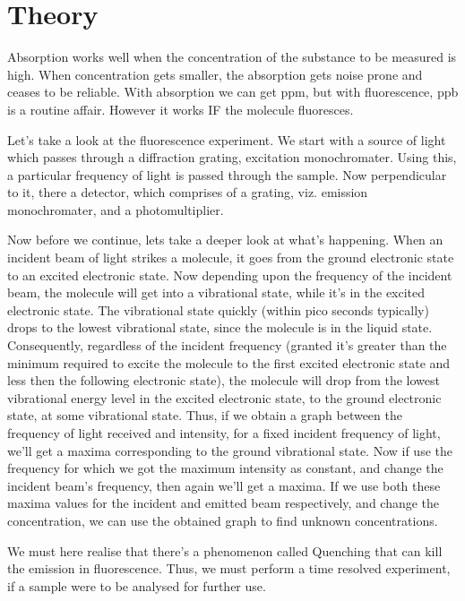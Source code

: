 \section{Theory}
	Absorption works well when the concentration of the substance to be measured is high. When concentration gets smaller, the absorption gets noise prone and ceases to be reliable. With absorption we can get ppm, but with fluorescence, ppb is a routine affair. However it works IF the molecule fluoresces.
	\par
	Let's take a look at the fluorescence experiment. We start with a source of light which passes through a diffraction grating, excitation monochromater. Using this, a particular frequency of light is passed through the sample. Now perpendicular to it, there a detector, which comprises of a grating, viz. emission monochromater, and a photomultiplier. 
	\par
	Now before we continue, lets take a deeper look at what's happening. When an incident beam of light strikes a molecule, it goes from the ground electronic state to an excited electronic state. Now depending upon the frequency of the incident beam, the molecule will get into a vibrational state, while it's in the excited electronic state. The vibrational state quickly (within pico seconds typically) drops to the lowest vibrational state, since the molecule is in the liquid state. Consequently, regardless of the incident frequency (granted it's greater than the minimum required to excite the molecule to the first excited electronic state and less then the following electronic state), the molecule will drop from the lowest vibrational energy level in the excited electronic state, to the ground electronic state, at some vibrational state. Thus, if we obtain a graph between the frequency of light received and intensity, for a fixed incident frequency of light, we'll get a maxima corresponding to the ground vibrational state.
	Now if use the frequency for which we got the maximum intensity as constant, and change the incident beam's frequency, then again we'll get a maxima.
	If we use both these maxima values for the incident and emitted beam respectively, and change the concentration, we can use the obtained graph to find unknown concentrations.
	\par
	We must here realise that there's a phenomenon called Quenching that can kill the emission in fluorescence. Thus, we must perform a time resolved experiment, if a sample were to be analysed for further use.

